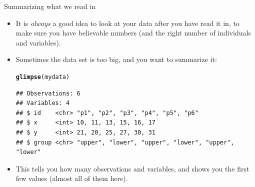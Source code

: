 \documentclass[unknownkeysallowed]{beamer}\usepackage[]{graphicx}\usepackage[]{color}
\makeatletter
\newcommand{\hlstd}[1]{\textcolor[rgb]{0.345,0.345,0.345}{#1}}%
\newcommand{\hlkwd}[1]{\textcolor[rgb]{0.737,0.353,0.396}{\textbf{#1}}}%
\newenvironment{kframe}{%
 \def\at@end@of@kframe{}%
 \ifinner\ifhmode%
  \def\at@end@of@kframe{\end{minipage}}%
  \begin{minipage}{\columnwidth}%
 \fi\fi%
 \def\FrameCommand##1{\hskip\@totalleftmargin \hskip-\fboxsep
 \colorbox{shadecolor}{##1}\hskip-\fboxsep
     \hskip-\linewidth \hskip-\@totalleftmargin \hskip\columnwidth}%
 \MakeFramed {\advance\hsize-\width
   \@totalleftmargin\z@ \linewidth\hsize
   \@setminipage}}%
 {\par\unskip\endMakeFramed%
 \at@end@of@kframe}
\newenvironment{knitrout}{}{} %
\makeatother
\begin{document}
\begin{frame}[fragile]{Summarizing what we read in}
  
  \begin{itemize}
  \item It is \emph{always} a good idea to look at your data after you
    have read it in, to make sure you have believable numbers (and the
    right number of individuals and variables). 
  \item Sometimes the data set is too big, and you want to summarize it:
    
\begin{knitrout}
\color{fgcolor}\begin{kframe}
\begin{alltt}
\hlkwd{glimpse}\hlstd{(mydata)}
\end{alltt}
\begin{verbatim}
## Observations: 6
## Variables: 4
## $ id    <chr> "p1", "p2", "p3", "p4", "p5", "p6"
## $ x     <int> 10, 11, 13, 15, 16, 17
## $ y     <int> 21, 20, 25, 27, 30, 31
## $ group <chr> "upper", "lower", "upper", "lower", "upper", "lower"
\end{verbatim}
\end{kframe}
\end{knitrout}

\item This tells you how many observations and variables, and shows
  you the first few values (almost all of them here).
  \end{itemize}
  
\end{frame}
\end{document}
